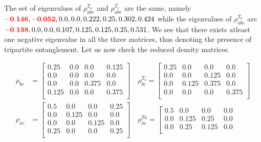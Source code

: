 \documentclass{scrartcl}
\begin{document}
        The set of eigenvalues of $\rho^{T_a}_{abc}$ and $\rho^{T_c}_{abc}$ are the same, namely $\mathcolor{red}{\mathbf{-0.146}}, \mathcolor{red}{\mathbf{-0.052}}, 0.0, 0.0, 0.222, 0.25, 0.302,\\ 0.424$ while the eigenvalues of $\rho^{T_b}_{abc}$ are $\mathcolor{red}{\mathbf{-0.138}}, 0.0, 0.0, 0.107, 0.125, 0.125, 0.25, 0.531$. We see that there exists atleast one negative eigenvalue in all the three matrices, thus denoting the presence of tripartite entanglement. Let us now check the reduced density matrices. 

        \begin{align*}
            \rho_{bc} &=
            \left[
            \begin{array}{cccc}
            0.25 & 0.0 & 0.0 & 0.125 \\
            0.0 & 0.0 & 0.0 & 0.0 \\
            0.0 & 0.0 & 0.375 & 0.0 \\
            0.125 & 0.0 & 0.0 & 0.375 \\
            \end{array}
            \right]\quad \rho_{bc}^{T_b} = 
            \left[
                \begin{array}{cccc}
                0.25 & 0.0 & 0.0 & 0.0 \\
                0.0 & 0.0 & 0.125 & 0.0 \\
                0.0 & 0.125 & 0.375 & 0.0 \\
                0.0 & 0.0 & 0.0 & 0.375 \\
                \end{array}
                \right]
                \\
            \rho_{ac} &=
            \left[
            \begin{array}{cccc}
            0.5 & 0.0 & 0.0 & 0.25 \\
            0.0 & 0.125 & 0.0 & 0.0 \\
            0.0 & 0.0 & 0.125 & 0.0 \\
            0.25 & 0.0 & 0.0 & 0.25 \\
            \end{array}
            \right]\quad \rho_{ac}^{Ta}= \left[
                \begin{array}{cccc}
                0.5 & 0.0 & 0.0 & 0.0 \\
                0.0 & 0.125 & 0.25 & 0.0 \\
                0.0 & 0.25 & 0.125 & 0.0 \\

\end{array}
\end{align*}
\end{document}
